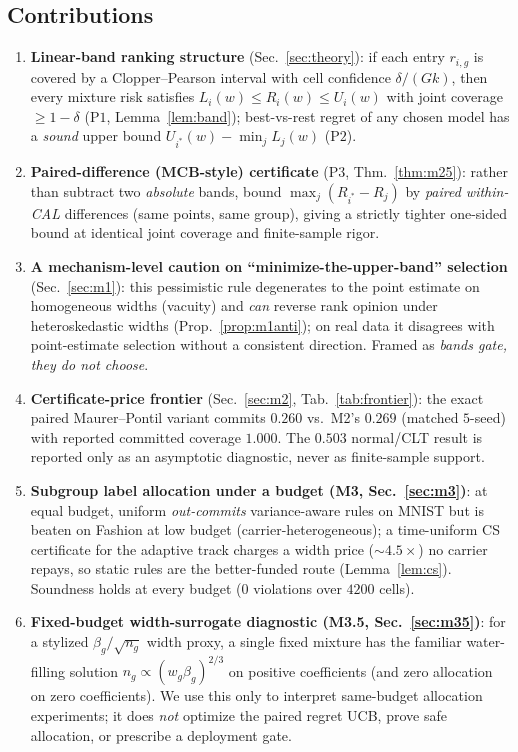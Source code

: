 \documentclass{article}
\begin{document}
\subsection{Contributions}
\begin{enumerate}
\item \textbf{Linear-band ranking structure} (Sec.~\ref{sec:theory}): if each entry
$r_{i,g}$ is covered by a Clopper--Pearson interval with cell confidence
$\delta/(G k)$, then every mixture risk satisfies $L_i(w)\le R_i(w)\le U_i(w)$ with joint
coverage $\ge 1-\delta$ ($\mathrm{P1}$, Lemma~\ref{lem:band}); best-vs-rest regret of any
chosen model has a \emph{sound} upper bound $U_{i^*}(w)-\min_j L_j(w)$ ($\mathrm{P2}$).
\item \textbf{Paired-difference (MCB-style) certificate} ($\mathrm{P3}$, Thm.~\ref{thm:m25}):
rather than subtract two \emph{absolute} bands, bound $\max_j(R_{i^*}-R_j)$ by
\emph{paired within-CAL} differences (same points, same group), giving a strictly tighter
one-sided bound at identical joint coverage and finite-sample rigor.
\item \textbf{A mechanism-level caution on ``minimize-the-upper-band'' selection}
(Sec.~\ref{sec:m1}): this pessimistic rule degenerates to the point estimate on homogeneous
widths (vacuity) and \emph{can} reverse rank opinion under heteroskedastic widths
(Prop.~\ref{prop:m1anti}); on real data it disagrees with point-estimate selection without a
consistent direction. Framed as \emph{bands gate, they do not choose}.
\item \textbf{Certificate-price frontier} (Sec.~\ref{sec:m2}, Tab.~\ref{tab:frontier}): the
exact paired Maurer--Pontil variant commits $0.260$ vs.\ M2's $0.269$ (matched $5$-seed) with
reported committed coverage $1.000$. The $0.503$ normal/CLT result is reported only as an
asymptotic diagnostic, never as finite-sample support.
\item \textbf{Subgroup label allocation under a budget (M3, Sec.~\ref{sec:m3})}: at equal
budget, uniform \emph{out-commits} variance-aware rules on MNIST but is beaten on Fashion at
low budget (carrier-heterogeneous); a time-uniform CS certificate for the adaptive track
charges a width price ($\sim4.5\times$) no carrier repays, so static rules are the
better-funded route (Lemma~\ref{lem:cs}). Soundness holds at every budget (0 violations over
$4200$ cells).
\item \textbf{Fixed-budget width-surrogate diagnostic (M3.5, Sec.~\ref{sec:m35})}: for a
stylized $\beta_g/\sqrt{n_g}$ width proxy, a single fixed mixture has the familiar
water-filling solution $n_g\propto(w_g\beta_g)^{2/3}$ on positive coefficients (and zero
allocation on zero coefficients). We use this only to interpret
same-budget allocation experiments; it does \emph{not} optimize the paired regret UCB, prove
safe allocation, or prescribe a deployment gate.
\end{enumerate}
\end{document}
